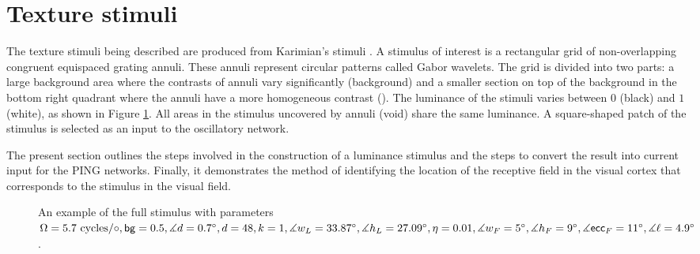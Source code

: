 \section{Texture stimuli}
\label{sec:external-stimuli}

The texture stimuli being described are produced from Karimian's stimuli \cite{MaryamPLACEHOLDER}. A stimulus of interest is a rectangular grid of non-overlapping congruent equispaced grating annuli. These annuli represent circular patterns called Gabor wavelets. The grid is divided into two parts: a large background area where the contrasts of annuli vary significantly (background) and a smaller section on top of the background in the bottom right quadrant where the annuli have a more homogeneous contrast (\stimfig). The luminance of the stimuli varies between $0$ (black) and $1$ (white), as shown in Figure \ref{fig:full-stimulus-example}. All areas in the stimulus uncovered by annuli (void) share the same luminance. A square-shaped patch of the stimulus \stimfig{} is selected as an input to the oscillatory network.

The present section outlines the steps involved in the construction of a luminance stimulus and the steps to convert the result into current input for the PING networks. Finally, it demonstrates the method of identifying the location of the receptive field in the visual cortex that corresponds to the stimulus in the visual field.

\begin{figure}[!htp]
    \centering
    
    \caption[Full stimulus annotated]{An example of the full stimulus with parameters $ \Omega = 5.7 \text{ cycles}/\circ, \mathsf{bg} = 0.5, \measuredangle d = 0.7^\circ, d = 48, k = 1, \measuredangle w_L = 33.87^\circ, \measuredangle h_L = 27.09^\circ, \eta = 0.01, \measuredangle w_F = 5^\circ, \measuredangle h_F = 9^\circ, \measuredangle \mathsf{ecc}_F = 11^\circ, \measuredangle \ell = 4.9^\circ$.}
    \label{fig:full-stimulus-example}
\end{figure}



